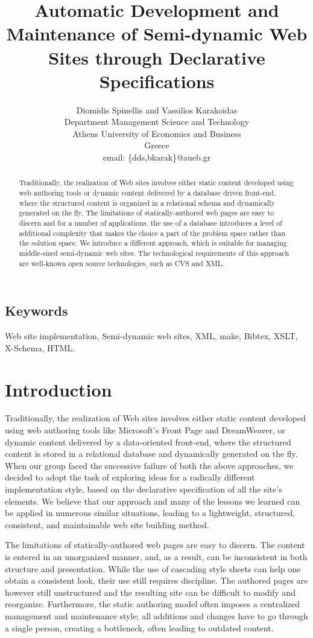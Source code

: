 \documentclass[10pt]{article}
\title{Automatic Development and Maintenance of Semi-dynamic Web Sites through Declarative Specifications}
\author{Diomidis Spinellis and Vassilios Karakoidas\\
Department Management Science and Technology \\
Athens University of Economics and Business \\
Greece\\
email: \{dds,bkarak\}@aueb.gr}
\date{}
\begin{document}
\maketitle

\begin{abstract}
\noindent
Traditionally, the realization of Web sites involves either
static content developed using web authoring tools or dynamic
content delivered by a database driven front-end,
where the structured content is organized
in a relational schema and dynamically generated on the fly.
The limitations of statically-authored web pages are easy to discern and
for a number of applications, the use of a database
introduces a level of additional complexity that
makes the choice a part of the problem space rather than the solution space.
We introduce a different approach, which is suitable for managing 
middle-sized semi-dynamic web sites. The technological requirements of this
approach are well-known open source technologies, such as CVS and XML.
\end{abstract}

\subsection*{Keywords}
Web site implementation, Semi-dynamic web sites, XML, make, Bibtex, XSLT, X-Schema, HTML.

\section{Introduction}
\label{sec:intro}
Traditionally, the realization of Web sites involves either
static content developed using web authoring tools like
Microsoft's Front Page and DreamWeaver, or dynamic
content delivered by a data-oriented front-end,
where the structured content is stored in a relational database 
and dynamically generated on the fly.
When our group faced the successive failure of both the above approaches,
we decided to adopt the task of exploring ideas for a radically different
implementation style, based on the declarative specification
of all the site's elements.
We believe that our approach and many of the lessons we learned
can be applied in numerous similar situations,
leading to a lightweight, structured, consistent, and maintainable
web site building method.

The limitations of statically-authored web pages are easy to discern.
The content is entered in an unorganized manner, and, as a result,
can be inconsistent in both structure and presentation.
While the use of cascading style sheets can help one obtain a
consistent look, their use still requires discipline.
The authored pages are however still unstructured and the resulting
site can be difficult to modify and reorganize.
Furthermore, the static authoring model often imposes a centralized
management and maintenance style;
all additions and changes have to go through a single person,
creating a bottleneck, often leading to outdated content.
\end{document}
